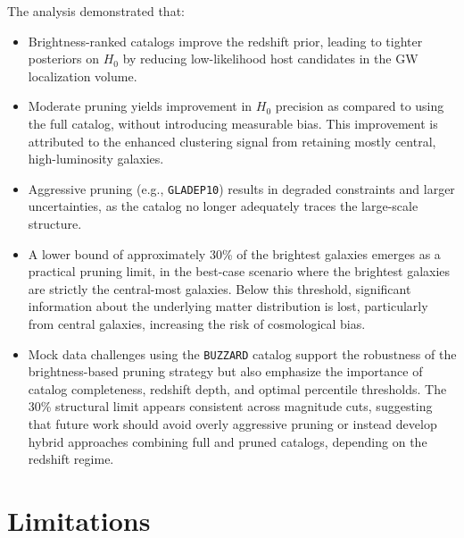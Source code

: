 The analysis demonstrated that:
\vspace{-1em}
\begin{itemize}
    \item Brightness-ranked catalogs improve the redshift prior, leading to tighter posteriors on $H_0$ by reducing low-likelihood host candidates in the \ac{GW} localization volume.
    \vspace{-1em}
    \item Moderate pruning yields improvement in $H_0$ precision as compared to using the full catalog, without introducing measurable bias. This improvement is attributed to the enhanced clustering signal from retaining mostly central, high-luminosity galaxies.
    \vspace{-1em}
    \item Aggressive pruning (e.g., \texttt{GLADEP10}) results in degraded constraints and larger uncertainties, as the catalog no longer adequately traces the large-scale structure.
    \vspace{-1em}
    \item A lower bound of approximately 30\% of the brightest galaxies emerges as a practical pruning limit, in the best-case scenario where the brightest galaxies are strictly the central-most galaxies. Below this threshold, significant information about the underlying matter distribution is lost, particularly from central galaxies, increasing the risk of cosmological bias.
    \vspace{-1em}
    \item Mock data challenges using the \texttt{BUZZARD} catalog support the robustness of the brightness-based pruning strategy but also emphasize the importance of catalog completeness, redshift depth, and optimal percentile thresholds. The 30\% structural limit appears consistent across magnitude cuts, suggesting that future work should avoid overly aggressive pruning or instead develop hybrid approaches combining full and pruned catalogs, depending on the redshift regime.
\end{itemize}

\section{Limitations}

